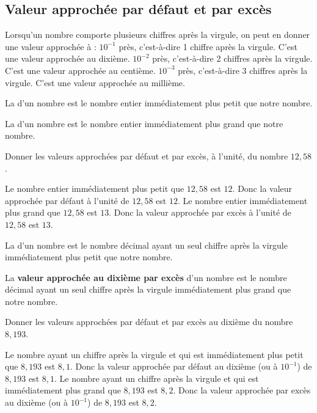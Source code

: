 \subsection{Valeur approchée par défaut et par excès}
 
\begin{remarque}
Lorsqu’un nombre comporte plusieurs chiffres après la virgule, on peut en donner une valeur approchée à :
$10^{-1}$ près, c’est-à-dire 1 chiffre après la virgule. C’est une valeur approchée au dixième.
$10^{-2}$ près, c’est-à-dire 2 chiffres après la virgule. C’est une valeur approchée au centième.
$10^{-3}$ près, c’est-à-dire 3 chiffres après la virgule. C’est une valeur approchée au millième.
\end{remarque}

\begin{definition}
La  d’un nombre est le nombre entier immédiatement plus petit que notre nombre.

La  d’un nombre est le nombre entier immédiatement plus grand que notre nombre.
\end{definition}

\begin{exemple*1}
Donner les valeurs approchées par défaut et par excès, à l'unité, du nombre $12,58$.

\correction
Le nombre entier immédiatement plus petit que $12,58$ est $12$. Donc la valeur approchée par défaut à l'unité de $12,58$ est $12$. Le nombre entier immédiatement plus grand que $12,58$ est $13$. Donc la valeur approchée par excès à l'unité de $12,58$ est $13$.
\end{exemple*1}



\begin{definition}
La  d’un nombre est le nombre décimal ayant un seul chiffre après la virgule immédiatement plus petit que notre nombre.

La \textbf{valeur approchée au dixième par excès}{} d’un nombre est le nombre décimal ayant un seul chiffre après la virgule immédiatement plus grand que notre nombre.
\end{definition}

\begin{exemple*1}
Donner les valeurs approchées par défaut et par excès au dixième du nombre $8,193$.

\correction
Le nombre ayant un chiffre après la virgule et qui est immédiatement plus petit que $8,193$ est $8,1$. Donc la valeur approchée par défaut au dixième (ou à $10^{-1}$) de $8,193$ est $8,1$. Le nombre ayant un chiffre après la virgule et qui est immédiatement plus grand que $8,193$ est $8,2$. Donc la valeur approchée par excès au dixième (ou à $10^{-1}$) de $8,193$ est $8,2$.
\end{exemple*1}


